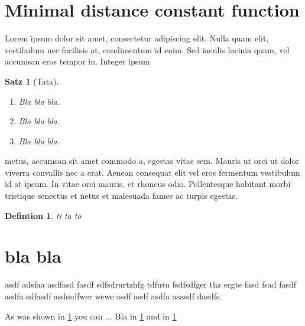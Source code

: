 \documentclass[a4paper]{scrartcl}
\newtheorem{theorem}{Satz}
\newtheorem{definition}{Defintion}
\begin{document}
\section{Minimal distance constant function}\label{sec:minimal-distance}
Lorem ipsum dolor sit amet, consectetur adipiscing elit. Nulla 
quam elit, vestibulum nec facilisis at, condimentum id enim. Sed 
iaculis lacinia quam, vel accumsan eros tempor in. Integer ipsum 

\begin{theorem}[Tata]\label{thm:bla-blup}
\begin{enumerate}
\item Bla bla bla.
\item Bla bla bla.
\item Bla bla bla.
\end{enumerate}
\end{theorem}

metus, accumsan sit amet commodo a, egestas vitae sem. Mauris ut 
orci ut dolor viverra convallis nec a erat. Aenean consequat elit 
vel eros fermentum vestibulum id at ipsum. In vitae orci mauris, et 
rhoncus odio. Pellentesque habitant morbi tristique senectus et netus 
et malesuada fames ac turpis egestas.

\begin{definition}\label{def:aha}
ti ta to
\end{definition}

\section{bla bla}
asdf adsfaa  asdfasd fasdf sdfsdrurtzhfg tdfutu  fsdfsdfger thz ergte
 fasd fsad fasdf asdfa sdfasdf asdssdfwer wewe asdf asdf asdfa asasdf
dasdfs.

As was shown in \cref{sec:minimal-distance} you can ...
Bla in \cref{thm:bla-blup} and in \cref{def:aha}
\end{document}
